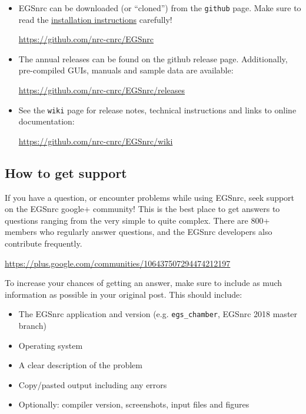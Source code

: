 \documentclass[12pt,twoside]{article}
\begin{document}
\begin{itemize}
\item EGSnrc can be downloaded (or ``cloned'') from the \Verb+github+ page. Make sure
to read the \href{https://github.com/nrc-cnrc/EGSnrc/wiki/Installation-overview}{installation instructions} carefully!

\href{https://github.com/nrc-cnrc/EGSnrc}{https://github.com/nrc-cnrc/EGSnrc}

\item The annual releases can be found on the github release page. Additionally,
pre-compiled GUIs, manuals and sample data are available:

\href{https://github.com/nrc-cnrc/EGSnrc/releases}{https://github.com/nrc-cnrc/EGSnrc/releases}

\item See the \Verb+wiki+ page for release notes, technical instructions and links to online documentation:

\href{https://github.com/nrc-cnrc/EGSnrc/wiki}{https://github.com/nrc-cnrc/EGSnrc/wiki}
\end{itemize}

\subsection{How to get support}
If you have a question, or encounter problems while using EGSnrc, seek support on the EGSnrc google+ community! This is the best place to get answers to questions ranging from the very simple to quite complex. There are 800+ members who regularly answer questions, and the EGSnrc developers also contribute frequently.

\href{https://plus.google.com/communities/106437507294474212197}{https://plus.google.com/communities/106437507294474212197}

To increase your chances of getting an answer, make sure to include as much information as possible in your original post. This should include:
\begin{itemize}
\item The EGSnrc application and version (e.g. \Verb+egs_chamber+, EGSnrc 2018 master branch)
\item Operating system
\item A clear description of the problem
\item Copy/pasted output including any errors
\item Optionally: compiler version, screenshots, input files and figures
\end{itemize}
\end{document}
